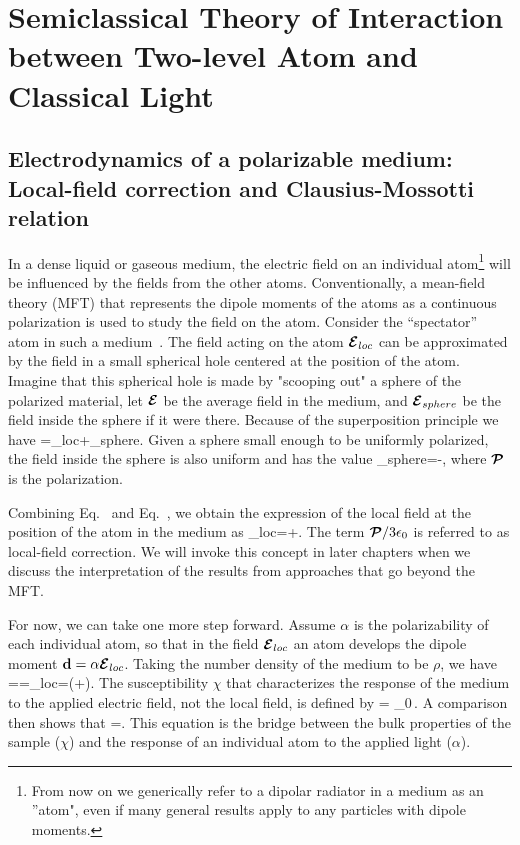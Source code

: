 \chapter{Semiclassical Theory of Interaction between Two-level Atom and Classical Light}

\section{Electrodynamics of a polarizable medium: Local-field correction and Clausius-Mossotti relation}
\label{LFC}

In a dense liquid or gaseous medium, the electric field on an individual atom\footnote{From now on we generically refer to a dipolar radiator in a medium as an ''atom", even if many general results apply to any particles with dipole moments.} will be influenced by the fields from the other atoms. Conventionally, a mean-field theory (MFT) that represents the dipole moments of the atoms as a continuous polarization is used to study the field on the atom.  Consider the ``spectator'' atom in such a medium~\cite{feynman}. The field acting on the atom $\cbE_{loc}$ can be approximated by the field in a small spherical hole centered at the position of the atom. Imagine that this spherical hole is made by "scooping out" a sphere of the polarized material, let $\cbE$ be the average field in the medium, and $\cbE_{sphere}$ be the field inside the sphere if it were there. Because of the superposition principle we have
\bea
\cbE=\cbE_{loc}+\cbE_{sphere}.
\label{E_MEAN}
\eea
Given a sphere small enough to be uniformly polarized,  the field inside the sphere is also uniform and has the value
\bea
\cbE_{sphere}=-,
\label{E_SPHERE}
\eea
where  $\cbP$ is the polarization.

Combining Eq.~ and Eq.~, we obtain the expression of the local field at the position of the atom in the medium as
\bea
\cbE_{loc}=\cbE+.
\label{LOCAL_FIELD}
\eea
The term $\cbP/3\epsilon_0$  is referred to as local-field correction. We will invoke this concept in later chapters when we discuss the interpretation of the results from approaches that go beyond the MFT.

For now, we can take one more step forward. Assume $\alpha$ is the polarizability of each individual atom, so that in the field $\cbE_{loc}$ an atom develops the dipole moment $\bd = \alpha \cbE_{loc}$.  Taking the number density of the medium to be $\rho$, we have
\bea
{\cbP}=\rho\bd=\rho\alpha\cbE_{loc}=\rho\alpha\left(\cbE+\right).
\label{POLARIZATION}
\eea
The susceptibility $\chi$ that characterizes the response of the medium to the applied electric field, not the local field, is defined by
\beq
{\cbP} = \epsilon_0\chi \cbE\,.
\eeq
A comparison then shows that
\bea
\chi=.
\label{LLLAW}
\eea
This equation is the bridge between the bulk properties of the sample ($\chi$) and the response of an individual atom to the applied light ($\alpha$). 

